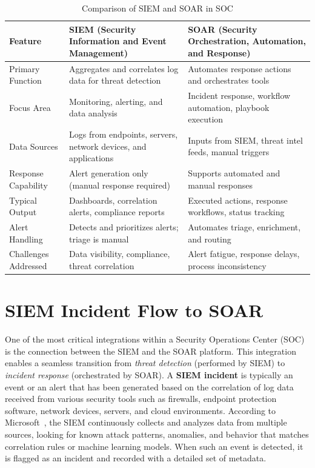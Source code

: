 \begin{table}[H]
\centering
\caption{Comparison of SIEM and SOAR in SOC}
\begin{tabular}{|p{4cm}|p{5cm}|p{5cm}|}
\hline
\textbf{Feature} & \textbf{SIEM (Security Information and Event Management)} & \textbf{SOAR (Security Orchestration, Automation, and Response)} \\
\hline
Primary Function & Aggregates and correlates log data for threat detection & Automates response actions and orchestrates tools \\
\hline
Focus Area & Monitoring, alerting, and data analysis & Incident response, workflow automation, playbook execution \\
\hline
Data Sources & Logs from endpoints, servers, network devices, and applications & Inputs from SIEM, threat intel feeds, manual triggers \\
\hline
Response Capability & Alert generation only (manual response required) & Supports automated and manual responses \\
\hline
Typical Output & Dashboards, correlation alerts, compliance reports & Executed actions, response workflows, status tracking \\
\hline
Alert Handling & Detects and prioritizes alerts; triage is manual & Automates triage, enrichment, and routing \\
\hline
Challenges Addressed & Data visibility, compliance, threat correlation & Alert fatigue, response delays, process inconsistency \\
\hline
\end{tabular}
\label{tab:siem-vs-soar}
\end{table}

\section{SIEM Incident Flow to SOAR}

One of the most critical integrations within a Security Operations Center (SOC) is the connection between the SIEM and the SOAR platform. This integration enables a seamless transition from \textit{threat detection} (performed by SIEM) to \textit{incident response} (orchestrated by SOAR). A \textbf{SIEM incident} is typically an event or an alert that has been generated based on the correlation of log data received from various security tools such as firewalls, endpoint protection software, network devices, servers, and cloud environments. According to Microsoft~\cite{microsoftsiem}, the SIEM continuously collects and analyzes data from multiple sources, looking for known attack patterns, anomalies, and behavior that matches correlation rules or machine learning models. When such an event is detected, it is flagged as an incident and recorded with a detailed set of metadata.

